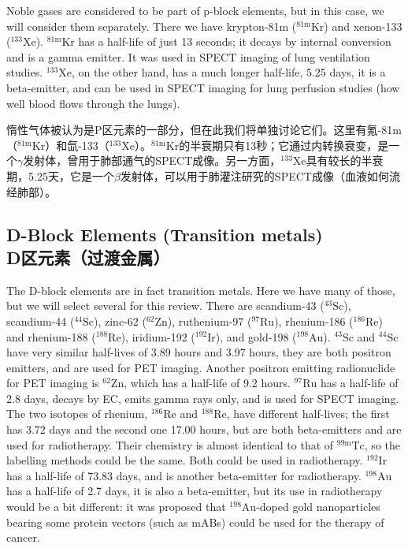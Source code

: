 \documentclass[dvipsnames, svgnames,a4paper,11pt]{article}
\begin{document}
Noble gases are considered to be part of p-block elements, but in this case, we will consider them separately. There we have krypton-81m (\(\mathrm{^{81m}Kr}\)) and xenon-133 (\(\mathrm{^{133}Xe}\)). \(\mathrm{^{81m}Kr}\) has a half-life of just 13 seconds; it decays by internal conversion and is a gamma emitter. It was used in SPECT imaging of lung ventilation studies. \(\mathrm{^{133}Xe}\), on the other hand, has a much longer half-life, 5.25 days, it is a beta-emitter, and can be used in SPECT imaging for lung perfusion studies (how well blood flows through the lungs).

惰性气体被认为是P区元素的一部分，但在此我们将单独讨论它们。这里有氪-81m（\(\mathrm{^{81m}Kr}\)）和氙-133（\(\mathrm{^{133}Xe}\)）。\(\mathrm{^{81m}Kr}\)的半衰期只有13秒；它通过内转换衰变，是一个$\gamma$发射体，曾用于肺部通气的SPECT成像。另一方面，\(\mathrm{^{133}Xe}\)具有较长的半衰期，5.25天，它是一个$\beta$发射体，可以用于肺灌注研究的SPECT成像（血液如何流经肺部）。

\subsection{D-Block Elements (Transition metals) \\D区元素（过渡金属）}  

The D-block elements are in fact transition metals. Here we have many of those, but we will select several for this review. There are scandium-43 (\(\mathrm{^{43}Sc}\)), scandium-44 (\(\mathrm{^{44}Sc}\)), zinc-62 (\(\mathrm{^{62}Zn}\)), ruthenium-97 (\(\mathrm{^{97}Ru}\)), rhenium-186 (\(\mathrm{^{186}Re}\)) and rhenium-188 (\(\mathrm{^{188}Re}\)), iridium-192 (\(\mathrm{^{192}Ir}\)), and gold-198 (\(\mathrm{^{198}Au}\)). \(\mathrm{^{43}Sc}\) and \(\mathrm{^{44}Sc}\) have very similar half-lives of 3.89 hours and 3.97 hours, they are both positron emitters, and are used for PET imaging. Another positron emitting radionuclide for PET imaging is \(\mathrm{^{62}Zn}\), which has a half-life of 9.2 hours. \(\mathrm{^{97}Ru}\) has a half-life of 2.8 days, decays by EC, emits gamma rays only, and is used for SPECT imaging. The two isotopes of rhenium, \(\mathrm{^{186}Re}\) and \(\mathrm{^{188}Re}\), have different half-lives; the first has 3.72 days and the second one 17.00 hours, but are both beta-emitters and are used for radiotherapy. Their chemistry is almost identical to that of \(\mathrm{^{99m}Tc}\), so the labelling methods could be the same. Both could be used in radiotherapy. \(\mathrm{^{192}Ir}\) has a half-life of 73.83 days, and is another beta-emitter for radiotherapy. \(\mathrm{^{198}Au}\) has a half-life of 2.7 days, it is also a beta-emitter, but its use in radiotherapy would be a bit different: it was proposed that \(\mathrm{^{198}Au}\)-doped gold nanoparticles bearing some protein vectors (such as mABs) could be used for the therapy of cancer.  
\end{document}
